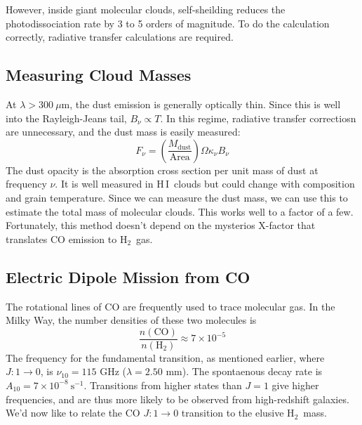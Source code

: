 \documentclass[10pt]{article}
\numberwithin{equation}{section}
\newcommand{\n}{\noindent}
\newcommand{\HI}{H\,I\ }
\newcommand{\Htwo}{H$_2$\ }
\begin{document}
  \n However, inside giant molecular clouds, self-sheilding reduces the
  photodissociation rate by 3 to 5 orders of magnitude. To do the calculation
  correctly, radiative transfer calculations are required.
  \subsection{Measuring Cloud Masses} %
  \label{sub:measuring_cloud_masses}
  At $\lambda > 300\ \mu\mathrm{m}$, the dust emission is generally optically thin. Since this is well into the Rayleigh-Jeans tail, $B_\nu\propto T$. In this regime, radiative transfer correctiosn are unnecessary, and the dust mass is easily measured:
  \begin{equation}
    \label{mols:5} F_\nu = \left(\frac{M_{\mathrm{dust}}}{\mathrm{Area}}\right)
    \Omega \kappa_\nu B_\nu
  \end{equation}
  The dust opacity is the absorption cross section per unit mass of dust at
  frequency $\nu$. It is well measured in \HI clouds but could change with
  composition and grain temperature. Since we can measure the dust mass, we can
  use this to estimate the total mass of molecular clouds. This works well to a
  factor of a few. Fortunately, this method doesn't depend on the mysterios 
  X-factor that translates CO emission to \Htwo gas.
  \subsection{Electric Dipole Mission from CO} %
  \label{sub:electric_dipole_mission_from_co}
  The rotational lines of CO are frequently used to trace molecular gas. In the
  Milky Way, the number densities of these two molecules is
  \begin{equation}
    \label{eq:CO:1} \frac{n(\mathrm{CO})}{n(\mathrm{H}_2)} \approx 7\times
    10^{-5}
  \end{equation}
  The frequency for the fundamental transition, as mentioned earlier, where $J:1\to 0$, is $\nu_10 = 115$ GHz ($\lambda = 2.50$ mm). The spontaenous decay rate is $A_{10}=7\times 10^{-8}\ \mathrm{s^{-1}}$. Transitions from higher states than $J=1$ give higher frequencies, and are thus more likely to be observed from high-redshift galaxies. We'd now like to relate the CO $J:1\to0$ transition to the elusive \Htwo mass.
\end{document}
